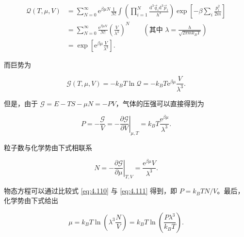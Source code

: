 \begin{equation}\label{eq:4.108}
  \begin{aligned}
    \mathcal{Q}(T,\mu,V)&=\sum_{N=0}^\infty\mathrm{e}^{\beta\mu N}\frac{1}{N!}\int\left(\prod_{i=1}^N\frac{\mathrm{d}^3\vec q_i\mathrm{d}^3\vec p_i}{h^3}\right)\exp\left[-\beta\sum_i\frac{p_i^2}{2m}\right]\\
    &=\sum_{N=0}^\infty\frac{\mathrm{e}^{\beta\mu N}}{N!}\left(\frac{V}{\lambda^3}\right)^N\qquad\left(\text{其中 }\lambda=\frac{h}{\sqrt{2\pi mk_BT}}\right)\\
    &=\exp\left[\mathrm{e}^{\beta\mu}\frac{V}{\lambda^3}\right].
  \end{aligned}
\end{equation}

而巨势为

\begin{equation}\label{eq:4.109}
  \mathcal{G}(T,\mu,V)=-k_BT\ln\mathcal{Q}=-k_BT\mathrm{e}^{\beta\mu}\frac{V}{\lambda^3}.
\end{equation}

但是，由于 $\mathcal{G}=E-TS-\mu N=-PV$，气体的压强可以直接得到为

\begin{equation}\label{eq:4.110}
  P=-\frac{\mathcal{G}}{V}=-\left.\frac{\partial\mathcal{G}}{\partial V}\right|_{\mu,T}=k_BT\frac{\mathrm{e}^{\beta\mu}}{\lambda^3}.
\end{equation}

粒子数与化学势由下式相联系

\begin{equation}\label{eq:4.111}
  N=-\left.\frac{\partial\mathcal{G}}{\partial\mu}\right|_{T,V}=\frac{\mathrm{e}^{\beta\mu}V}{\lambda^3}.
\end{equation}

物态方程可以通过比较式 \eqref{eq:4.110} 与 \eqref{eq:4.111} 得到，即 $P=k_BTN/V$。最后，化学势由下式给出

\begin{equation}\label{eq:4.112}
  \mu=k_BT\ln\left(\lambda^3\frac{N}{V}\right)=k_BT\ln\left(\frac{P\lambda^3}{k_BT}\right).
\end{equation}

